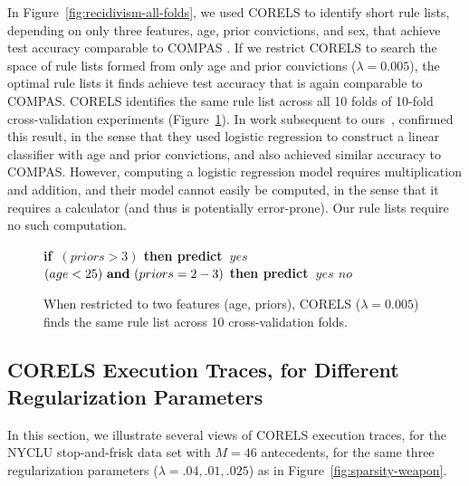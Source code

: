 \documentclass[twoside,11pt]{article}
\def\bif{\bf if~}
\def\belif{{\bf else if~}}
\def\bthen{{\bf then predict~}}
\def\belse{{\bf else predict~}}
\def \band{{\bf ~and~}}
\def\Reg{{\lambda}}
\begin{document}
In Figure~\ref{fig:recidivism-all-folds}, we used CORELS to identify short
rule lists, depending on only three features, age, prior convictions, and sex,
that achieve test accuracy comparable to COMPAS
\citep[Figure~\ref{fig:compas-comparison}, also see][]{AngelinoLaAlSeRu17-kdd}.
%
If we restrict CORELS to search the space of rule lists formed from only age
and prior convictions (${\Reg=0.005}$), the optimal rule lists it finds achieve
test accuracy that is again comparable to COMPAS.
%
CORELS identifies the same rule list across all 10 folds of 10-fold
cross-validation experiments (Figure~\ref{fig:compas-two-features}).
%
In work subsequent to ours~\citep{AngelinoLaAlSeRu17-kdd}, \citet{Dressel2018}
confirmed this result, in the sense that they used logistic regression to
construct a linear classifier with age and prior convictions,
and also achieved similar accuracy to COMPAS.
%
However, computing a logistic regression model requires multiplication and
addition, and their model cannot easily be computed, in the sense that it
requires a calculator (and thus is potentially error-prone).
%
Our rule lists require no such computation.

\begin{figure}[t!]
\begin{algorithmic}
\State \bif $(priors > 3)$ \bthen $yes$
\State \belif $(age < 25) \band (priors = 2-3)$ \bthen $yes$
\State \belse $no$
\end{algorithmic}
\caption{When restricted to two features (age, priors), CORELS (${\Reg=0.005}$)
finds the same rule list across 10 cross-validation folds.}
\label{fig:compas-two-features}
\end{figure}

\subsection{CORELS Execution Traces, for Different Regularization Parameters}
\label{sec:reg-param}
In this section, we illustrate several views of CORELS execution traces,
for the NYCLU stop-and-frisk data set with ${M = 46}$ antecedents,
for the same three regularization parameters (${\Reg = .04, .01, .025}$)
as in Figure~\ref{fig:sparsity-weapon}.
\end{document}
